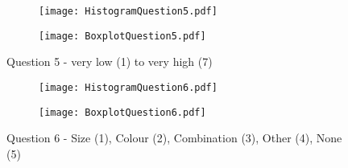 \begin{figure}[htbp] %
\begin{center} 
\begin{subfigure} 
\centering
\texttt{[image: HistogramQuestion5.pdf]}
\end{subfigure} 
\begin{subfigure} 
\centering
\texttt{[image: BoxplotQuestion5.pdf]}
\end{subfigure}
  \caption[Question 5 - Histogram and Box plot]{Question 5 - very low (1) to very high (7)}
    \label{Question5} 
\end{center}
\end{figure}
\begin{figure}[htbp] %
\begin{center} 
\begin{subfigure} 
\centering
\texttt{[image: HistogramQuestion6.pdf]}
\end{subfigure} 
\begin{subfigure} 
\centering
\texttt{[image: BoxplotQuestion6.pdf]}
\end{subfigure}
  \caption[Question 6 - Histogram and Box plot]{Question 6 - Size (1), Colour (2), Combination (3), Other (4), None (5)}
    \label{Question6} 
\end{center}
\end{figure}
		
